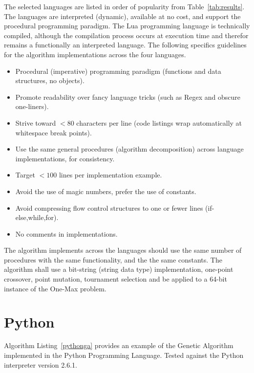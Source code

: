 \documentclass[a4paper, 11pt]{article}
\begin{document}
The selected languages are listed in order of popularity from Table~\ref{tab:results}. The languages are interpreted (dynamic),  available at no cost, and support the procedural programming paradigm. The Lua programming language is technically compiled, although the compilation process occurs at execution time and therefor remains a functionally an interpreted language.
The following specifics guidelines for the algorithm implementations across the four languages. 
\begin{itemize}
	\item Procedural (imperative) programming paradigm (functions and data structures, no objects).
	\item Promote readability over fancy language tricks (such as Regex and obscure one-liners).
	\item Strive toward $<80$ characters per line (code listings wrap automatically at whitespace break points).
	\item Use the same general procedures (algorithm decomposition) across language implementations, for consistency.
	\item Target $<100$ lines per implementation example.
	\item Avoid the use of magic numbers, prefer the use of constants.
	\item Avoid compressing flow control structures to one or fewer lines (if-else,while,for).
	\item No comments in implementations.
\end{itemize}

The algorithm implements across the languages should use the same number of procedures with the same functionality, and the the same constants. The algorithm shall use a bit-string (string data type) implementation, one-point crossover, point mutation, tournament selection and be applied to a 64-bit instance of the One-Max problem. 

% 
% 
\section{Python}
\label{sec:python}
Algorithm Listing~\ref{pythonga} provides an example of the Genetic Algorithm implemented in the Python Programming Language. Tested against the Python interpreter version 2.6.1.

\end{document}
